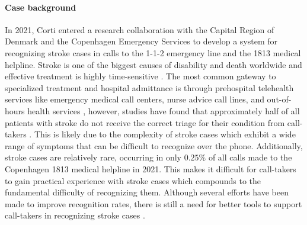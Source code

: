 \paragraph{Case background} In 2021, Corti entered a research collaboration with the Capital Region of Denmark and the Copenhagen Emergency Services to develop a system for recognizing stroke cases in calls to the 1-1-2 emergency line and the 1813 medical helpline. 
Stroke is one of the biggest causes of disability and death worldwide \parencite{cite1,cite2,cite3} and effective treatment is highly time-sensitive \parencite{cite4,cite5}. The most common gateway to specialized treatment and hospital admittance is through prehospital telehealth services like emergency medical call centers, nurse advice call lines, and out-of-hours health services \parencite{cite6,cite7}, however, studies have found that approximately half of all patients with stroke do not receive the correct triage for their condition from call-takers \parencite{cite10,cite11,cite12}. 
This is likely due to the complexity of stroke cases which exhibit a wide range of symptoms that can be difficult to recognize over the phone. Additionally, stroke cases are relatively rare, occurring in only $0.25\%$ of all calls made to the Copenhagen 1813 medical helpline in 2021. This makes it difficult for call-takers to gain practical experience with stroke cases which compounds to the fundamental difficulty of recognizing them. Although several efforts have been made to improve recognition rates, there is still a need for better tools to support call-takers in recognizing stroke cases \parencite{cite13,cite14,cite15}.

